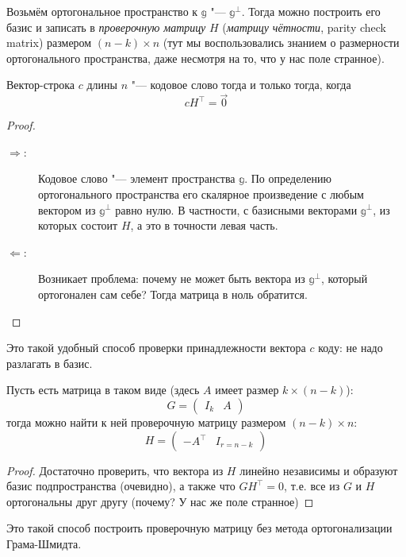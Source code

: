 \begin{Def}
Возьмём ортогональное пространство к $\mathbb g$ "--- $\mathbb g^{\bot}$.
Тогда можно построить его базис и записать в \textit{проверочную матрицу} $H$
(\textit{матрицу чётности}, parity check matrix) размером $(n-k)\times n$
(тут мы воспользовались знанием о размерности ортогонального пространства,
даже несмотря на то, что у нас поле странное).
\end{Def}
\begin{lemma}
	Вектор-строка $c$ длины $n$ "--- кодовое слово тогда и только тогда, когда
	\[
		c H^\top = \vec 0
	\]
\end{lemma}
\begin{proof}
	\begin{description}
	\item[$\Rightarrow$:]
		Кодовое слово "--- элемент пространства $\mathbb g$.
		По определению ортогонального пространства его скалярное произведение
		с любым вектором из $\mathbb g^\bot$ равно нулю.
		В частности, с базисными векторами $\mathbb g^\bot$, из которых состоит $H$,
		а это в точности левая часть.
	\item[$\Leftarrow$:]
		\TODO
			Возникает проблема: почему не может быть вектора из $\mathbb g^\bot$,
			который ортогонален сам себе?
			Тогда матрица в ноль обратится.
	\end{description}
\end{proof}
\begin{Rem}
	Это такой удобный способ проверки принадлежности вектора $c$
	коду: не надо разлагать в базис.
\end{Rem}

\begin{lemma}
	Пусть есть матрица в таком виде (здесь $A$ имеет размер $k\times(n-k)$):
	\[
		G = \left(\begin{array}{c|c} I_k & A \end{array}\right)
	\]
	тогда можно найти к ней проверочную матрицу размером $(n-k)\times n$:
	\[
		H = \left(\begin{array}{c|c} -A^\top & I_{r=n-k} \end{array}\right)
	\]
\end{lemma}
\begin{proof}
	Достаточно проверить, что вектора из $H$ линейно независимы и образуют
	базис подпространства (очевидно), а также что $GH^\top=0$, т.е. все
	из $G $ и $H$ ортогональны друг другу (\TODO почему? У нас же поле странное)
	\TODO
\end{proof}
\begin{Rem}
	Это такой способ построить проверочную матрицу
	без метода ортогонализации Грама-Шмидта.
\end{Rem}

